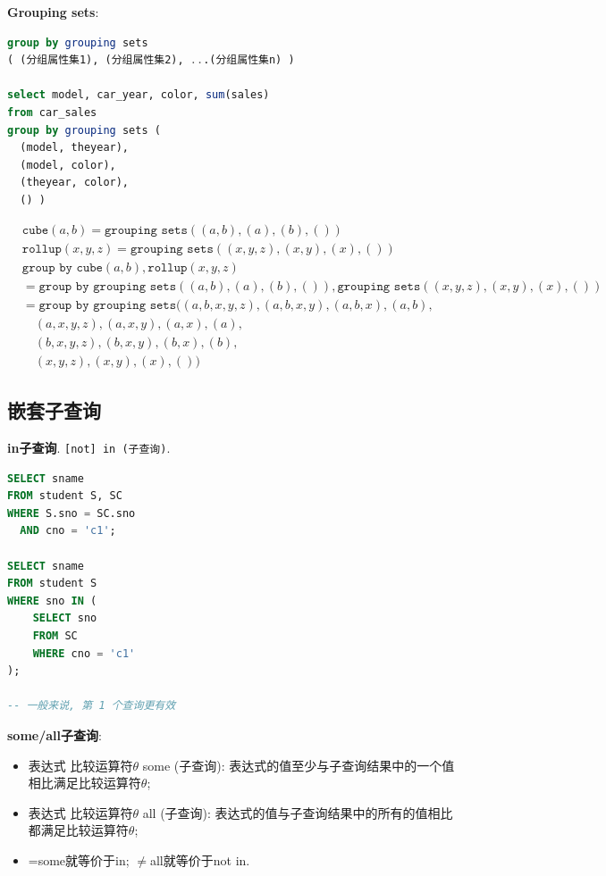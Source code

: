 \textbf{Grouping sets}:
\begin{lstlisting}[language=SQL]
group by grouping sets
( (分组属性集1), (分组属性集2), ...(分组属性集n) )

select model, car_year, color, sum(sales)
from car_sales
group by grouping sets (
  (model, theyear),
  (model, color),
  (theyear, color),
  () )
\end{lstlisting}

\begin{align*}
&\texttt{cube}(a, b) = \texttt{grouping sets}((a, b), (a), (b), ()) \\
&\texttt{rollup}(x, y, z) = \texttt{grouping sets}((x, y, z), (x, y), (x), ()) \\
&\texttt{group by cube}(a, b), \texttt{rollup}(x, y, z) \\
&= \texttt{group by } \texttt{grouping sets}((a, b), (a), (b), ()), \texttt{grouping sets}((x, y, z), (x, y), (x), ()) \\
&= \texttt{group by grouping sets}((a, b, x, y, z), (a, b, x, y), (a, b, x), (a, b), \\
&\quad (a, x, y, z), (a, x, y), (a, x), (a), \\
&\quad (b, x, y, z), (b, x, y), (b, x), (b), \\
&\quad (x, y, z), (x, y), (x), ())
\end{align*}

\subsection{嵌套子查询}

\textbf{in子查询}. \verb|[not] in (子查询)|.

\begin{lstlisting}[language=SQL]
SELECT sname
FROM student S, SC
WHERE S.sno = SC.sno
  AND cno = 'c1';

SELECT sname
FROM student S
WHERE sno IN (
    SELECT sno
    FROM SC
    WHERE cno = 'c1'
);

-- 一般来说, 第 1 个查询更有效
\end{lstlisting}

\textbf{some/all子查询}:
\begin{itemize}
  \item 表达式 比较运算符$\theta$ some (子查询): 表达式的值至少与子查询结果中的一个值相比满足比较运算符$\theta$;
  \item 表达式 比较运算符$\theta$ all (子查询): 表达式的值与子查询结果中的所有的值相比都满足比较运算符$\theta$;
  \item =some就等价于in; $\neq$all就等价于not in.
\end{itemize}

